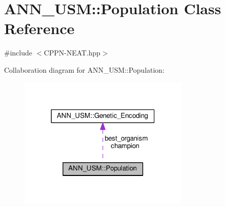 \hypertarget{class_a_n_n___u_s_m_1_1_population}{\section{A\-N\-N\-\_\-\-U\-S\-M\-:\-:Population Class Reference}
\label{class_a_n_n___u_s_m_1_1_population}
}


{\ttfamily \#include $<$C\-P\-P\-N-\/\-N\-E\-A\-T.\-hpp$>$}



Collaboration diagram for A\-N\-N\-\_\-\-U\-S\-M\-:\-:Population\-:\nopagebreak
\begin{figure}[H]
\begin{center}
\leavevmode
\includegraphics[width=232pt]{class_a_n_n___u_s_m_1_1_population__coll__graph}
\end{center}
\end{figure}
